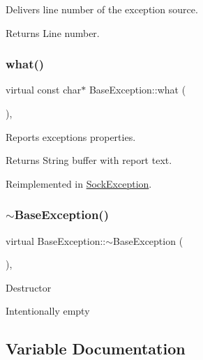 Delivers line number of the exception source. \begin{DoxyReturn}{Returns}
Line number. 
\end{DoxyReturn}
\mbox{\label{group__EXCEPT__GROUP_gaf092dd6587491cd7a8cdd987597b1018}} 
\subsubsection{\texorpdfstring{what()}{what()}}
{\footnotesize\ttfamily virtual const char$\ast$ Base\+Exception\+::what (\begin{DoxyParamCaption}{ }\end{DoxyParamCaption})\hspace{0.3cm}{\ttfamily [inline]}, {\ttfamily [virtual]}}

Reports exception\textquotesingle{}s properties. \begin{DoxyReturn}{Returns}
String buffer with report text. 
\end{DoxyReturn}


Reimplemented in \hyperlink{classSockException_afb2986f2ddefe08ae1e735796cd05b1a}{Sock\+Exception}.

\mbox{\label{group__EXCEPT__GROUP_gabc351b149be47d3e078dc04b9b5c8891}} 
\subsubsection{\texorpdfstring{$\sim$\+Base\+Exception()}{~BaseException()}}
{\footnotesize\ttfamily virtual Base\+Exception\+::$\sim$\+Base\+Exception (\begin{DoxyParamCaption}{ }\end{DoxyParamCaption})\hspace{0.3cm}{\ttfamily [inline]}, {\ttfamily [virtual]}}

Destructor

Intentionally empty 

\subsection{Variable Documentation}
\mbox{\label{group__EXCEPT__GROUP_gab2b4ea653318d8effd1d4d6d3cdc53d2}} 
